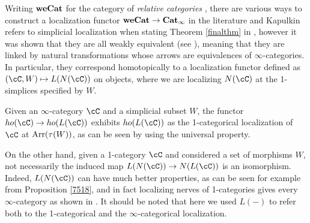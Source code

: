 \begin{rmk}
  Writing $\operatorname{\mathbf{weCat}}$ for the category of \emph{relative categories}
  \cite{BK12}, there are various ways to construct a localization functor
  $\operatorname{\mathbf{weCat}}\rightarrow\operatorname{\mathbf{Cat}}_\infty$ in the literature and Kapulkin refers to
  simplicial localization when stating Theorem \ref{finalthm} in
  \cite{Kap14}, however it was shown that they are all weakly equivalent (see
  \cite[Ex.\ 1.6.3]{Bar16}), meaning
  that they are linked by natural transformations whose arrows are equivalences
  of $\infty$-categories. In particular, they correspond homotopically to a
  localization functor defined as $(\cC,W)\mapsto L(N(\cC))$ on objects, where
  we are localizing $N(\cC)$ at the 1-simplices specified by $W$.
\end{rmk}

\begin{rmk}

  Given an $\infty$-category $\cC$ and a simplicial subset $W$, the functor
  $ho(\cC)\rightarrow ho(L(\cC))$ exhibits $ho(L(\cC))$ as the
  1-categorical localization of $\cC$ at $\operatorname{Arr}(\tau(W))$, as can be seen by
  using the universal property.

  \noindent
  On the other hand, given a 1-category $\cC$ and considered a set of
  morphisms $W$, not necessarily the induced map $L(N(\cC))\rightarrow
  N(L(\cC))$ is an isomorphism. Indeed, $L(N(\cC))$ can have much better
  properties, as can be seen for example from Proposition \ref{7518}, and in
  fact localizing nerves of 1-categories gives every $\infty$-category as shown
  in \cite[Prop.\ 7.3.15]{Cis19}. It should be noted that here we used $L(-)$
  to refer both to the 1-categorical and the $\infty$-categorical localization.
\end{rmk}


